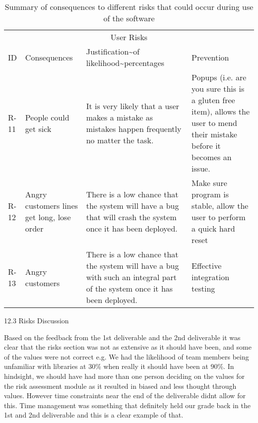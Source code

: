 \begin{table}
    \centering
    \caption{Summary of consequences to different risks that could occur during use of the software}
    \begin{tabular}{llll}
        \multicolumn{4}{c}{User Risks}                                                                                                                                                                                                                                                                            \\
        ID   & Consequences                               & Justification\textasciitilde{}of likelihood\textasciitilde{}percentages                                                   & Prevention                                                                                                                \\
        R-11 & People could get sick                      & It is very likely that a user makes a mistake as mistakes happen frequently no matter the task.                           & Popups (i.e. are you sure this is a gluten free item), allows the user to mend their mistake before it becomes an issue.  \\
        R-12 & Angry customers lines get long, lose order & There is a low chance that the system will have a bug that will crash the system once it has been deployed.               & Make sure program is stable, allow the user to perform a quick hard reset                                                 \\
        R-13 & Angry customers                            & There is a low chance that the system will have a bug with such an integral part of the system once it has been deployed. & Effective integration testing
    \end{tabular}
\end{table}


12.3 Risks Discussion

Based on the feedback from the 1st deliverable and the 2nd deliverable it was clear that the risks section was not as extensive as it should have been, and some of the values were not correct e.g. We had the likelihood of team members being unfamiliar with libraries at 30\% when really it should have been at 90\%. In hindsight, we should have had more than one person deciding on the values for the risk assessment module as it resulted in biased and less thought through values. However time constraints near the end of the deliverable didnt allow for this. Time management was something that definitely held our grade back in the 1st and 2nd deliverable and this is a clear example of that.

